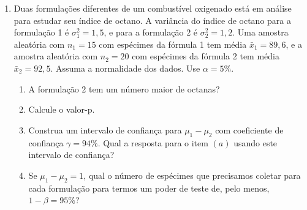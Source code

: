 \documentclass[8pt, a4paper]{article}
\begin{document}
\begin{enumerate}
	\item Duas formulações diferentes de um combustível oxigenado está em análise para estudar seu índice de octano. A variância  do índice de octano para a formulação 1 é $\sigma_1^2 = 1,5$, e para a formulação 2 é $\sigma_2^2 = 1,2$. Uma amostra aleatória com $n_1=15$ com espécimes da fórmula 1 tem média $\bar{x}_1 = 89,6$, e a amostra aleatória com $n_2=20$ com espécimes da fórmula 2 tem média $\bar{x}_2 = 92,5$. Assuma a normalidade dos dados. Use $\alpha=5\%$.
	\begin{enumerate}
		\item A formulação 2 tem um número maior de octanas? 
		\item Calcule o valor-p.
		\item Construa um intervalo de confiança para $\mu_1 - \mu_2$ com coeficiente de confiança $\gamma=94\%$. Qual a resposta para o item $(a)$ usando este intervalo de confiança?
		\item Se $\mu_1 - \mu_2 = 1$, qual o número de espécimes que precisamos coletar para cada formulação para termos um poder de teste de, pelo menos, $1-\beta = 95\%$? 
	\end{enumerate}


\end{enumerate}
\end{document}
